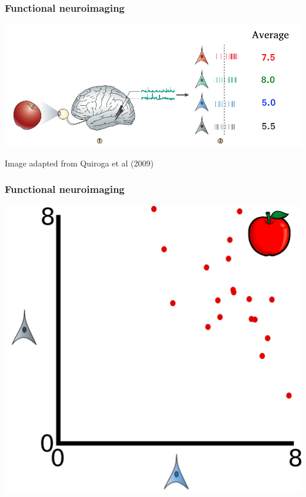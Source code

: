 \documentclass{beamer}
\begin{document}
\begin{frame}
\frametitle{Functional neuroimaging}
\begin{minipage}[t][.8\textheight]{\textwidth}
\vspace{0.6in}

\begin{center}
\includegraphics[scale = 0.3]{intro1.png}
\end{center}
\end{minipage}
{\small Image adapted from Quiroga et al (2009)}
\end{frame}

\begin{frame}
\frametitle{Functional neuroimaging}
\begin{center}
\includegraphics[scale = 0.3]{intro2.png}
\end{center}
\end{frame}
\end{document}
